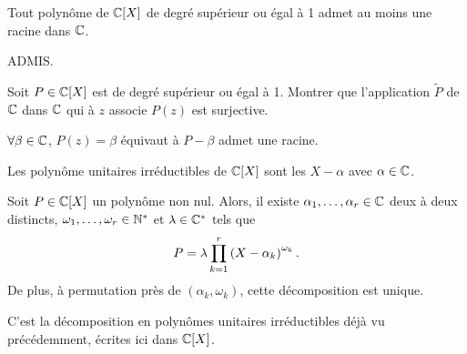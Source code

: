 \documentclass{magnolia}
\begin{document}
\begin{theoreme}[nom={Théorème de d'\nom{Alembert}-\nom{Gauss}}]
Tout polynôme de $\polyC$ de degré supérieur ou égal à 1 admet au moins une
racine dans $\mathbb{C}$.  
\end{theoreme}

\begin{preuve}
ADMIS.
\end{preuve}

\begin{exoUnique}
\exo Soit $P\in\polyC$ est de degré supérieur ou égal à 1. Montrer que
  l'application
  $\tilde{P}$ de $\mathbb{C}$ dans $\mathbb{C}$ qui à $z$ associe $P(z)$ est surjective.
  \begin{sol}
  $\forall \beta \in \mathbb{C}$, $P(z)=\beta$ équivaut à $P-\beta$ admet une racine.
  \end{sol}
\end{exoUnique}

\begin{proposition}
Les polynôme unitaires irréductibles de $\polyC$ sont les $X-\alpha$ avec
$\alpha\in\mathbb{C}$.
\end{proposition}

\begin{proposition}
Soit $P\in\polyC$ un polynôme non nul. Alors, il existe
$\alpha_1,\ldots,\alpha_r\in\mathbb{C}$ deux à deux distincts,
$\omega_1,\ldots,\omega_r\in{\mathbb{N}^*}$ et $\lambda\in\mathbb{C}^*$ tels que
\[P=\lambda \prod_{k=1}^r \left(X-\alpha_k\right)^{\omega_k}.\]
De plus, à permutation près de $(\alpha_k,\omega_k)$, cette décomposition est unique.
\end{proposition}

\begin{preuve}
C'est la décomposition en polynômes unitaires irréductibles déjà vu précédemment, écrites ici dans $\polyC$.
\end{preuve}
\end{document}
